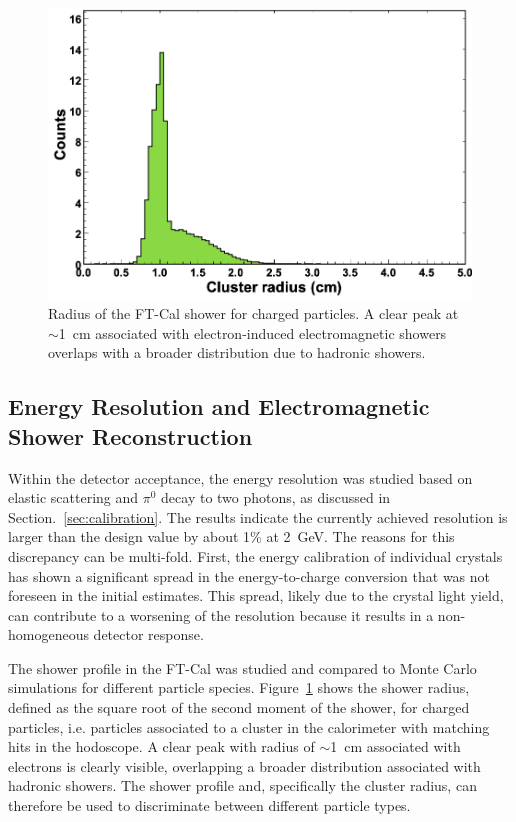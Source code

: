 \begin{figure}[h]
\includegraphics[height=0.65\columnwidth]{fig/ft_shower.png}
\caption{Radius of the FT-Cal shower for charged particles. A clear peak at $\sim$1~cm associated with
  electron-induced electromagnetic showers overlaps with a broader distribution due to hadronic showers.}
\label{fig:ft_shower}
\end{figure}

\subsection{Energy Resolution and Electromagnetic Shower Reconstruction}

Within the detector acceptance, the energy resolution was studied based on elastic scattering and $\pi^0$ decay to
two photons, as discussed in Section.~\ref{sec:calibration}. The results indicate the currently achieved resolution is
larger than the design value by about 1\% at 2~GeV. The reasons for this discrepancy can be multi-fold. First, the
energy calibration of individual crystals has shown a significant spread in the energy-to-charge conversion that was
not foreseen in the initial estimates. This spread, likely due to the crystal light yield, can contribute to a worsening
of the resolution because it results in a non-homogeneous detector response. 

The shower profile in the FT-Cal was studied and compared to Monte Carlo simulations for different particle
species. Figure~\ref{fig:ft_shower} shows the shower radius, defined as the square root of the second moment of
the shower, for charged particles, i.e. particles associated to a cluster in the calorimeter with matching hits in the
hodoscope. A clear peak with radius of $\sim$1~cm associated with electrons is clearly visible, overlapping a
broader distribution associated with hadronic showers. The shower profile and, specifically the cluster radius, can
therefore be used to discriminate between different particle types.

